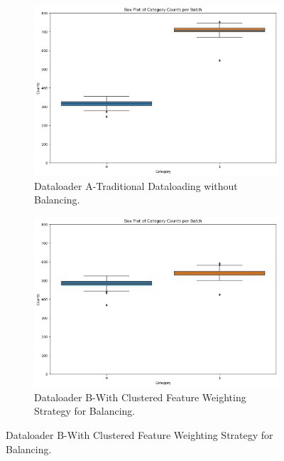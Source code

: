 \begin{figure}[htbp]
    \centering
    \begin{subfigure}[b]{0.7\textwidth}
        \includegraphics[width=\textwidth]{Images_Thesis/Dataloader_comp/Images_0_001/output_d_a_binary_box_plot_0_001.png}
        \caption{Dataloader A-Traditional Dataloading without Balancing.}
        \label{fig:Box plot for 0_001 experiment with dataloader A}
    \end{subfigure}
    \hfill %
    \begin{subfigure}[b]{0.7\textwidth}
        \includegraphics[width=\textwidth]{Images_Thesis/Dataloader_comp/Images_0_001/output_d_b_box_plot_0_001.png}
        \caption{Dataloader B-With Clustered Feature Weighting Strategy for Balancing.}
        \label{fig:Box plot for 0_001 experiment with dataloader B (novel)}
    \end{subfigure}


\end{figure}
